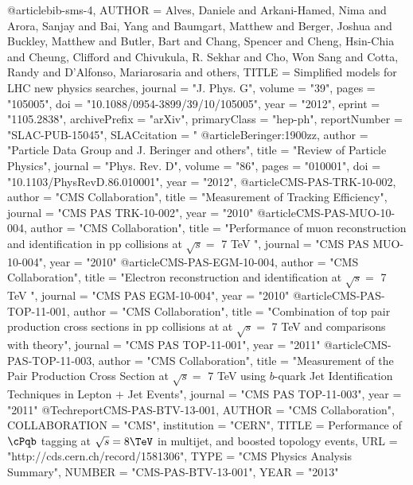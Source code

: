@article{bib-sms-4,
  AUTHOR         = {Alves, Daniele and  Arkani-Hamed, Nima and Arora, Sanjay and Bai, Yang
               and Baumgart, Matthew and Berger, Joshua and Buckley, Matthew and Butler, Bart
                    and Chang, Spencer and Cheng, Hsin-Chia and Cheung, Clifford and
                    Chivukula, R. Sekhar and Cho, Won Sang and Cotta, Randy
                    and D'Alfonso, Mariarosaria and others},
  TITLE          = {Simplified models for {LHC} new physics searches},
      journal        = "J. Phys. G",
      volume         = "39",
      pages          = "105005",
      doi            = "10.1088/0954-3899/39/10/105005",
      year           = "2012",
      eprint         = "1105.2838",
      archivePrefix  = "arXiv",
      primaryClass   = "hep-ph",
      reportNumber   = "SLAC-PUB-15045",
      SLACcitation   = "%
}
@article{Beringer:1900zz,
      author = "{Particle Data Group} and J. Beringer and others",
      title = "{Review of Particle Physics}",
      journal = "Phys. Rev. D",
      volume = "86",
      pages = "010001",
      doi = "10.1103/PhysRevD.86.010001",
      year = "2012",
}
@article{CMS-PAS-TRK-10-002,
     author    = "{CMS Collaboration}",
     title        = "Measurement of Tracking Efficiency",
     journal   = "CMS PAS TRK-10-002",
     year         = "2010"
}
@article{CMS-PAS-MUO-10-004,
     author    = "{CMS Collaboration}",
     title        = "Performance of muon reconstruction and identification in pp collisions at $\sqrt{s} =$ 7 TeV ",
     journal   = "CMS PAS MUO-10-004",
     year         = "2010"
}
@article{CMS-PAS-EGM-10-004,
     author    = "{CMS Collaboration}",
     title        = "Electron reconstruction and identification at $\sqrt{s} =$ 7 TeV ",
     journal   = "CMS PAS EGM-10-004",
     year         = "2010"
}
@article{CMS-PAS-TOP-11-001,
     author    = "{CMS Collaboration}",
     title        = "Combination of top pair production cross sections in pp collisions at at $\sqrt{s} =$ 7 TeV and comparisons with theory",
     journal   = "CMS PAS TOP-11-001",
     year         = "2011"
}
@article{CMS-PAS-TOP-11-003,
     author    = "{CMS Collaboration}",
     title     = "Measurement of the \ttbar Pair Production Cross Section at $\sqrt{s} =$ 7 TeV using $b$-quark Jet Identification Techniques in Lepton $+$ Jet Events",
     journal   = "CMS PAS TOP-11-003",
     year      = "2011"
}
@Techreport{CMS-PAS-BTV-13-001,
      AUTHOR      = "{CMS Collaboration}",
      COLLABORATION = "{CMS}",
      institution    = "CERN",
      TITLE       = {Performance of $\cPqb$ tagging at $\sqrt{s}=8\TeV$ in multijet,
                    \ttbar and boosted topology events},
      URL         = "http://cds.cern.ch/record/1581306",
      TYPE        = "CMS Physics Analysis Summary",
      NUMBER      = "CMS-PAS-BTV-13-001",
      YEAR        = "2013"
}
